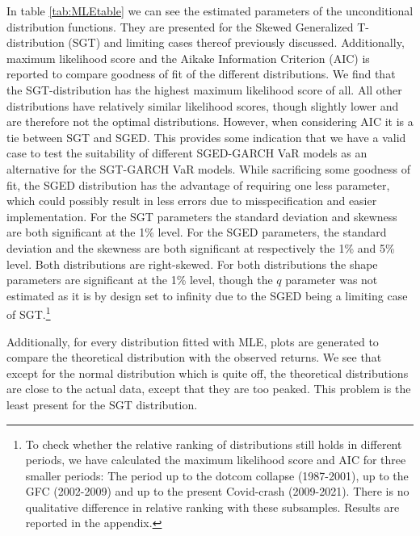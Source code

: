 \documentclass[a4paper, twoside]{templates/ociamthesis}
\begin{document}
In table \ref{tab:MLEtable} we can see the estimated parameters of the unconditional distribution functions. They are presented for the Skewed Generalized T-distribution (SGT) and limiting cases thereof previously discussed. Additionally, maximum likelihood score and the Aikake Information Criterion (AIC) is reported to compare goodness of fit of the different distributions. We find that the SGT-distribution has the highest maximum likelihood score of all. All other distributions have relatively similar likelihood scores, though slightly lower and are therefore not the optimal distributions. However, when considering AIC it is a tie between SGT and SGED. This provides some indication that we have a valid case to test the suitability of different SGED-GARCH VaR models as an alternative for the SGT-GARCH VaR models. While sacrificing some goodness of fit, the SGED distribution has the advantage of requiring one less parameter, which could possibly result in less errors due to misspecification and easier implementation. For the SGT parameters the standard deviation and skewness are both significant at the 1\% level. For the SGED parameters, the standard deviation and the skewness are both significant at respectively the 1\% and 5\% level. Both distributions are right-skewed. For both distributions the shape parameters are significant at the 1\% level, though the \(q\) parameter was not estimated as it is by design set to infinity due to the SGED being a limiting case of SGT.\footnote{To check whether the relative ranking of distributions still holds in different periods, we have calculated the maximum likelihood score and AIC for three smaller periods: The period up to the dotcom collapse (1987-2001), up to the GFC (2002-2009) and up to the present Covid-crash (2009-2021). There is no qualitative difference in relative ranking with these subsamples. Results are reported in the appendix.}

Additionally, for every distribution fitted with MLE, plots are generated to compare the theoretical distribution with the observed returns. We see that except for the normal distribution which is quite off, the theoretical distributions are close to the actual data, except that they are too peaked. This problem is the least present for the SGT distribution.
\end{document}
